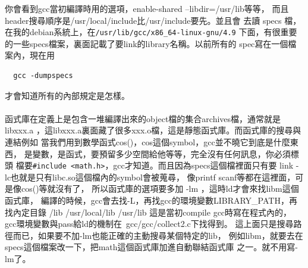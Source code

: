   你會看到gcc當初編譯時用的選項，enable-shared --libdir=/usr/lib等等，
  而且header搜尋順序是/usr/local/include比/usr/include要先。並且會
  去讀 specs 檔，在我的debian系統上，在\verb=/usr/lib/gcc/x86_64-linux-gnu/4.9=
  下面，有很重要的一些specs檔案，裏面記載了要link的library名稱。以前所有的
  spec寫在一個檔案內，現在用
  \begin{verbatim}
  gcc -dumpspecs
  \end{verbatim}
  才會知道所有的內部規定是怎樣。
  \\\\
  函式庫在定義上是包含一堆編譯出來的object檔的集合archives檔，通常就是libxxx.a
  ，這libxxx.a裏面藏了很多xxx.o檔，這是靜態函式庫。而函式庫的搜尋與連結例如
  當我們用到數學函式cos()，cos這個symbol，gcc並不曉它到底是什麼東西，
  是變數，是函式，要預留多少空間給他等等，完全沒有任何訊息，你必須標頭
  檔要\verb=#include <math.h>=，gcc才知道。而且因為specs這個檔裡面只有要
  link -lc也就是只有libc.so這個檔內的symbol會被蒐尋，
  像printf scanf等都在這裡面，可是像cos()等就沒有了，
  所以函式庫的選項要多加 -lm ，這時ld才會來找libm這個函式庫，
  編譯的時候，gcc會去找-L，再找gcc的環境變數LIBRARY\_PATH，再找內定目錄
  /lib /usr/local/lib /usr/lib 這是當初compile gcc時寫在程式內的，
  gcc環境變數與pass給ld的機制在~gcc/gcc/collect2.c下找得到。
  這上面只是搜尋路徑而已，如果要不加-lm也能正確的主動搜尋某個特定的lib，
  例如libm，就要去在specs這個檔案改一下，把math這個函式庫加進自動聯結函式庫
  之一。就不用寫-lm了。

